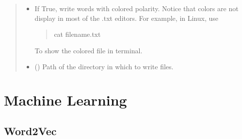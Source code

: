 \documentclass[letterpaper,10pt,english]{sphinxmanual}
\begin{document}
\begin{fulllineitems}
\begin{quote}
\begin{description}
\begin{itemize}
\item {} 
 \textendash{} 
If True, write words with colored polarity. Notice that colors are not display in most of the .txt editors.
For example, in Linux, use
\begin{quote}

%
\begin{sphinxVerbatim}[commandchars=\\\{\}]
cat file\PYGZus{}name.txt
\end{sphinxVerbatim}
\end{quote}

To show the colored file in terminal.


\item {} 
 () \textendash{} Path of the directory in which to write files.

\end{itemize}

\end{description}\end{quote}

\end{fulllineitems}



\chapter{Machine Learning}
\label{\detokenize{learning:machine-learning}}\label{\detokenize{learning::doc}}

\section{Word2Vec}
\label{\detokenize{learning:module-loacore.learning.word_embeddings}}\label{\detokenize{learning:word2vec}}
\end{document}
